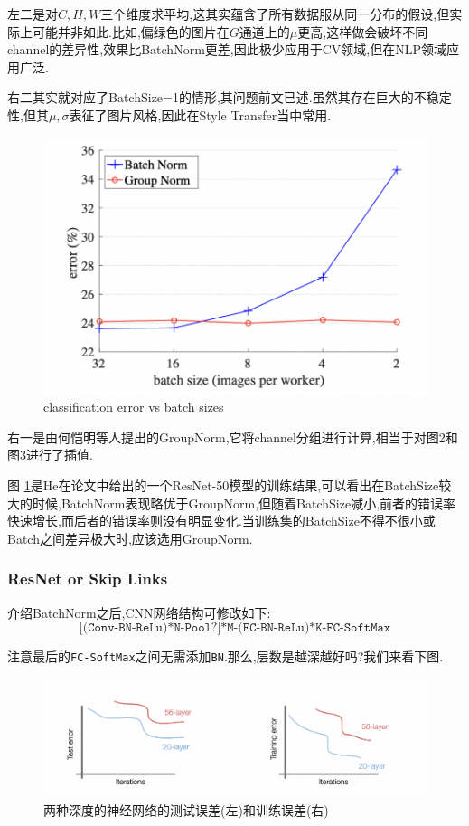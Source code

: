 左二是对$C,H,W$三个维度求平均,这其实蕴含了所有数据服从同一分布的假设,但实际上可能并非如此.比如,偏绿色的图片在$G$通道上的$\mu$更高,这样做会破坏不同channel的差异性,效果比BatchNorm更差,因此极少应用于CV领域,但在NLP领域应用广泛.

右二其实就对应了BatchSize=1的情形,其问题前文已述.虽然其存在巨大的不稳定性,但其$\mu, \sigma$表征了图片风格,因此在Style Transfer当中常用.

\begin{figure}
	\includegraphics[scale=0.30]{figures/GroupNorm.png}
	\caption{classification error vs batch sizes}
	\label{groupNorm}
\end{figure}

右一是由何恺明等人提出的GroupNorm,它将channel分组进行计算,相当于对图2和图3进行了插值.

图 \ref{groupNorm}是He在论文中给出的一个ResNet-50模型的训练结果,可以看出在BatchSize较大的时候,BatchNorm表现略优于GroupNorm,但随着BatchSize减小,前者的错误率快速增长,而后者的错误率则没有明显变化.当训练集的BatchSize不得不很小或Batch之间差异极大时,应该选用GroupNorm.


\subsubsection{ResNet or Skip Links}
介绍BatchNorm之后,CNN网络结构可修改如下:
$$\texttt{[(Conv-BN-ReLu)*N-Pool?]*M-(FC-BN-ReLu)*K-FC-SoftMax}$$

注意最后的\texttt{FC-SoftMax}之间无需添加\texttt{BN}.那么,层数是越深越好吗?我们来看下图.
\begin{figure}[htbp]
	\centering
	\includegraphics[scale=0.65]{figures/deep-test-err.png}
	\caption{两种深度的神经网络的测试误差(左)和训练误差(右)}
	\label{过拟合}
\end{figure}

